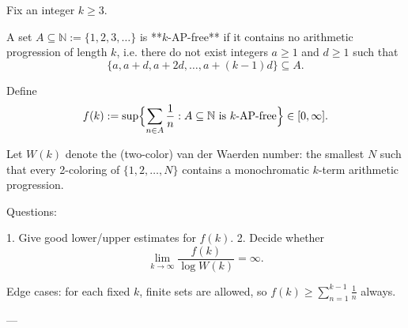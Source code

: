 Fix an integer $k\ge 3$.

A set $A\subseteq\mathbb N:=\{1,2,3,\dots\}$ is **$k$-AP-free** if it contains no arithmetic progression of length $k$, i.e. there do not exist integers $a\ge 1$ and $d\ge 1$ such that
\[
\{a,a+d,a+2d,\dots,a+(k-1)d\}\subseteq A.
\]

Define
\[
f(k):=\sup\Bigl\{\sum_{n\in A}\frac{1}{n}: A\subseteq\mathbb N\text{ is $k$-AP-free}\Bigr\}\in[0,\infty].
\]

Let $W(k)$ denote the (two-color) van der Waerden number: the smallest $N$ such that every 2-coloring of $\{1,2,\dots,N\}$ contains a monochromatic $k$-term arithmetic progression.

Questions:

1. Give good lower/upper estimates for $f(k)$.
2. Decide whether
\[
\lim_{k\to\infty} \frac{f(k)}{\log W(k)} = \infty.
\]

Edge cases: for each fixed $k$, finite sets are allowed, so $f(k)\ge \sum_{n=1}^{k-1} \frac1n$ always.

---
